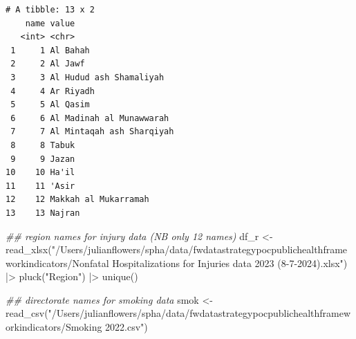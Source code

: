 \documentclass[
  letterpaper,
  DIV=11,
  numbers=noendperiod]{scrreprt}
\newenvironment{Shaded}{\begin{snugshade}}{\end{snugshade}}
\newcommand{\DocumentationTok}[1]{\textcolor[rgb]{0.37,0.37,0.37}{\textit{#1}}}
\newcommand{\FunctionTok}[1]{\textcolor[rgb]{0.28,0.35,0.67}{#1}}
\newcommand{\NormalTok}[1]{\textcolor[rgb]{0.00,0.23,0.31}{#1}}
\newcommand{\OtherTok}[1]{\textcolor[rgb]{0.00,0.23,0.31}{#1}}
\newcommand{\SpecialCharTok}[1]{\textcolor[rgb]{0.37,0.37,0.37}{#1}}
\newcommand{\StringTok}[1]{\textcolor[rgb]{0.13,0.47,0.30}{#1}}
\begin{document}
\begin{verbatim}
# A tibble: 13 x 2
    name value                    
   <int> <chr>                    
 1     1 Al Bahah                 
 2     2 Al Jawf                  
 3     3 Al Hudud ash Shamaliyah  
 4     4 Ar Riyadh                
 5     5 Al Qasim                 
 6     6 Al Madinah al Munawwarah 
 7     7 Al Mintaqah ash Sharqiyah
 8     8 Tabuk                    
 9     9 Jazan                    
10    10 Ha'il                    
11    11 'Asir                    
12    12 Makkah al Mukarramah     
13    13 Najran                   
\end{verbatim}

\begin{Shaded}
\begin{Highlighting}[]
\DocumentationTok{\#\# region names for injury data (NB only 12 names)}
\NormalTok{df\_r }\OtherTok{\textless{}{-}} \FunctionTok{read\_xlsx}\NormalTok{(}\StringTok{"/Users/julianflowers/spha/data/fwdatastrategypocpublichealthframeworkindicators/Nonfatal Hospitalizations for Injuries data 2023 (8{-}7{-}2024).xlsx"}\NormalTok{) }\SpecialCharTok{|\textgreater{}} \FunctionTok{pluck}\NormalTok{(}\StringTok{"Region"}\NormalTok{) }\SpecialCharTok{|\textgreater{}} \FunctionTok{unique}\NormalTok{()}

\DocumentationTok{\#\# directorate names for smoking data}
\NormalTok{smok }\OtherTok{\textless{}{-}} \FunctionTok{read\_csv}\NormalTok{(}\StringTok{"/Users/julianflowers/spha/data/fwdatastrategypocpublichealthframeworkindicators/Smoking 2022.csv"}\NormalTok{) }
\end{Highlighting}
\end{Shaded}
\end{document}
